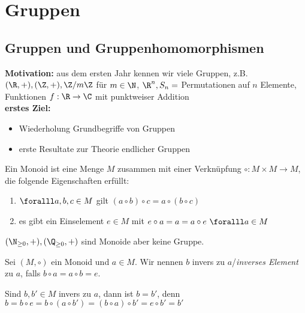 \chapter{Gruppen}\lecture

\section{Gruppen und Gruppenhomomorphismen}

\textbf{Motivation:} aus dem ersten Jahr kennen wir viele Gruppen, z.B. $(\R,+), (\Z,+), \Z/m\Z$ für $m \in \N$, $\R^n, S_n = $ Permutationen auf $n$ Elemente, Funktionen $f: \R \to \C$ mit punktweiser Addition\\
\textbf{erstes Ziel:}
    \begin{itemize}
        \item Wiederholung Grundbegriffe von Gruppen
        \item erste Resultate zur Theorie endlicher Gruppen
    \end{itemize}

\begin{defn*}[Monoid]
    Ein Monoid ist eine Menge $M$ zusammen mit einer Verknüpfung $\circ: M \times M \to M$, die folgende Eigenschaften erfüllt:
    \begin{enumerate}[label={\roman*})]
        \item $\foralll a,b,c \in M$ gilt $(a \circ b) \circ c = a \circ (b \circ c)$
        \item es gibt ein Einselement $e \in M$ mit $e \circ a = a = a \circ e \ \foralll a \in M$
    \end{enumerate}
\end{defn*}

\begin{rem*}
	$ (\N_{\geq 0},+),(\Q_{\geq 0},+) $ sind Monoide aber keine Gruppe.
\end{rem*}

\begin{defn*}[Inverselemente]
	Sei $ (M,\circ) $ ein Monoid und $a \in M$. Wir nennen $b$ invers zu $a$/\emph{inverses Element} zu $a$, falls $b \circ a = a \circ b = e$.
\end{defn*}

\begin{rem*}
	Sind $b, b' \in M$ invers zu $a$, dann ist $b = b'$, denn $b = b \circ e = b \circ (a \circ b') = (b \circ a) \circ b' = e \circ b' = b'$
\end{rem*}


